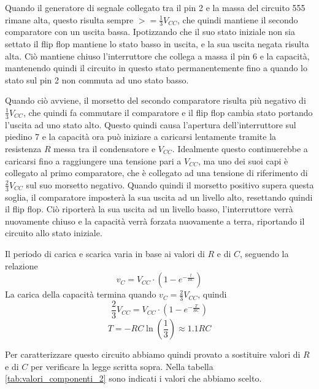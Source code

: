 \noindent
Quando il generatore di segnale collegato tra il pin 2 e la massa del circuito 555 rimane alta, questo risulta sempre $>=\frac{1}{3}V_{CC}$, che quindi mantiene il secondo comparatore con un uscita bassa. Ipotizzando che il suo stato iniziale non sia settato il flip flop mantiene lo stato basso in uscita, e la sua uscita negata risulta alta. Ciò mantiene chiuso l'interruttore che collega a massa il pin 6 e la capacità, mantenendo quindi il circuito in questo stato permanentemente fino a quando lo stato sul pin 2 non commuta ad uno stato basso.

\noindent
Quando ciò avviene, il morsetto del secondo comparatore risulta più negativo di $\frac{1}{3}V_{CC}$, che quindi fa commutare il comparatore e il flip flop cambia stato portando l'uscita ad uno stato alto. Questo quindi causa l'apertura dell'interruttore sul piedino 7 e la capacità ora può iniziare a caricarsi lentamente tramite la resistenza $R$ messa tra il condensatore e $V_{CC}$. Idealmente questo continuerebbe a caricarsi fino a raggiungere una tensione pari a $V_{CC}$, ma uno dei suoi capi è collegato al primo comparatore, che è collegato ad una tensione di riferimento di $\frac{2}{3}V_{CC}$ sul suo morsetto negativo. Quando quindi il morsetto positivo supera questa soglia, il comparatore imposterà la sua uscita ad un livello alto, resettando quindi il flip flop. Ciò riporterà la sua uscita ad un livello basso, l'interruttore verrà nuovamente chiuso e la capacità verrà forzata nuovamente a terra, riportando il circuito allo stato iniziale.

\noindent
Il periodo di carica e scarica varia in base ai valori di $R$ e di $C$, seguendo la relazione
\[v_C = V_{CC}\cdot\left(1-e^{-\frac{t}{RC}}\right)\]
La carica della capacità termina quando $v_C = \frac{2}{3}V_{CC}$, quindi
\[\frac{2}{3}V_{CC} = V_{CC}\cdot\left(1-e^{-\frac{T}{RC}}\right)\]
\[T=-RC\ln\left(\frac{1}{3}\right)\approx1.1RC\]

Per caratterizzare questo circuito abbiamo quindi provato a sostituire valori di $R$ e di $C$ per verificare la legge scritta sopra. Nella tabella \ref{tab:valori_componenti_2} sono indicati i valori che abbiamo scelto.

